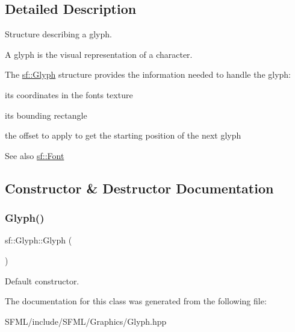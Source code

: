 \subsection{Detailed Description}
Structure describing a glyph. 

\begin{DoxyVerb}\end{DoxyVerb}


A glyph is the visual representation of a character.

The \mbox{\hyperlink{classsf_1_1_glyph}{sf\+::\+Glyph}} structure provides the information needed to handle the glyph\+: \begin{DoxyItemize}
\item its coordinates in the font\textquotesingle{}s texture \item its bounding rectangle \item the offset to apply to get the starting position of the next glyph\end{DoxyItemize}
\begin{DoxySeeAlso}{See also}
\mbox{\hyperlink{classsf_1_1_font}{sf\+::\+Font}} \begin{DoxyVerb}\end{DoxyVerb}
 
\end{DoxySeeAlso}


\subsection{Constructor \& Destructor Documentation}
\mbox{\label{classsf_1_1_glyph_ab15cfc37eb7b40a94b3b3aedf934010b}} 
\subsubsection{\texorpdfstring{Glyph()}{Glyph()}}
{\footnotesize\ttfamily sf\+::\+Glyph\+::\+Glyph (\begin{DoxyParamCaption}{ }\end{DoxyParamCaption})\hspace{0.3cm}{\ttfamily [inline]}}



Default constructor. 

\begin{DoxyVerb}\end{DoxyVerb}
 

The documentation for this class was generated from the following file\+:\begin{DoxyCompactItemize}
\item 
S\+F\+M\+L/include/\+S\+F\+M\+L/\+Graphics/Glyph.\+hpp\end{DoxyCompactItemize}
